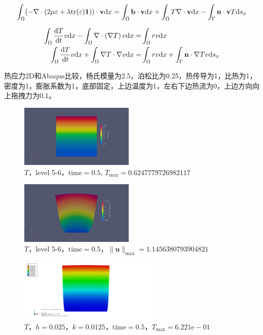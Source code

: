 \begin{align*}
   \int_{\Omega}(-\nabla\cdot(2\mu\mathbf\varepsilon + \lambda\mathrm{tr}(\mathbf \varepsilon)\mathbf 1))\cdot\mathbf v \mathrm{d} x
   = \int_{\Omega}\mathbf b\cdot\mathbf v\mathrm{d} x  + \int_{\Omega} T\nabla\cdot\mathbf v \mathrm{d} x - \int_{\Gamma}\mathbf n\cdot\mathbf v T\mathrm{d} s_x
\end{align*}

\begin{align*}
  \int_{\Omega}\frac{\mathrm{d} T}{\mathrm{d} t}v\mathrm{d} x - \int_{\Omega}\nabla\cdot \left(\nabla T\right)v\mathrm{d} x   =& \int_{\Omega}rv\mathrm{d} x \\
  \int_{\Omega}\frac{\mathrm{d} T}{\mathrm{d} t}v\mathrm{d} x + \int_{\Omega}\nabla T\cdot\nabla v\mathrm{d} x   =& \int_{\Omega}rv\mathrm{d} x + \int_{\Gamma}\mathbf n\cdot\nabla T v\mathrm{d} s_x
\end{align*}


  
热应力2D和Abaqus比较，杨氏模量为2.5，泊松比为0.25，热传导为1，比热为1，密度为1，膨胀系数为1，底部固定，上边温度为1，左右下边热流为0，上边方向向上拖拽力为0.1。  

\begin{figure}[!htbp]
  \centering
  \includegraphics[height=3cm]{fig/4/3.10.5:1.png}
  \caption{$T$，level 5-6，$\mathrm{time}=0.5$, $T_{\max}=0.6247779726982117$}
  \label{fig:4.1.4:4}
\end{figure}

\begin{figure}[!htbp]
  \centering
  \includegraphics[height=3cm]{fig/4/3.10.5:2.png}
  \caption{$T$，level 5-6，$\mathrm{time}=0.5$，$\|\mathbf u\|_{\max}=1.1456380793904821$}
  \label{fig:4.1.4:4}
\end{figure}

\begin{figure}[!htbp]
  \centering
  \includegraphics[height=3cm]{fig/4/3.10.5:3.png}
  \caption{$T$，$h=0.025$，$k=0.0125$，$\mathrm{time}=0.5$，$T_{\max}=6.221\mathrm e-01$}
  \label{fig:4.1.4:4}
\end{figure}

